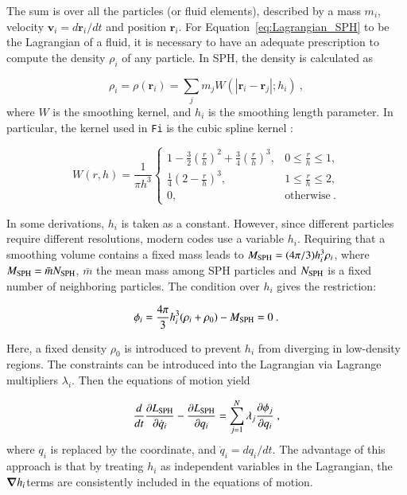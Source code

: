 \begin{appendixs}
	The sum is over all the particles (or fluid elements), described by a mass $m_i$, velocity $\mathbf{v}_i = d \mathbf{r}_i/dt$ and position $\mathbf{r}_i$. For Equation~\ref{eq:Lagrangian_SPH} to be the Lagrangian of a fluid, it is necessary to have an adequate prescription to compute the density $\rho_i$ of any particle. In SPH, the density is calculated as
	
	\begin{equation}
		\rho_i = \rho(\mathbf{r}_i) = \sum_{j} m_j W(|\mathbf{r}_i - \mathbf{r}_j|;h_i)~,
	\end{equation}
	where $W$ is the smoothing kernel, and $h_i$ is the smoothing length parameter. In particular, the kernel used in \texttt{Fi} is the cubic spline kernel \citep{pelupessy2005numerical,monaghan1992smoothed}:
	
	\begin{equation}
		W(r,h) = \frac{1}{\pi h^3}
		\begin{cases}
			1 - \frac{3}{2}\left(\frac{r}{h}\right)^2 + \frac{3}{4}\left(\frac{r}{h}\right)^3, & 0 \leq \frac{r}{h} \leq 1, \\[2ex]
			\frac{1}{4}\left(2 - \frac{r}{h}\right)^3, & 1 \leq \frac{r}{h} \leq 2, \\[2ex]
			0, & \text{otherwise}~.
		\end{cases}
	\end{equation}
	
	In some derivations, $h_i$ is taken as a constant. However, since different particles require different resolutions, modern codes use a variable $h_i$. Requiring that a smoothing volume contains a fixed mass leads to $M_{\rm SPH} = (4 \pi /3)h_i^3 \rho_i$, where $M_{\rm SPH} = \bar{m}N_{\rm SPH}$, $\bar{m}$ the mean mass among SPH particles and $N_{\rm SPH}$ is a fixed number of neighboring particles. The condition over $h_i$ gives the restriction:
	
	\begin{equation}
		\phi_i = \frac{4 \pi}{3}h_i^3(\rho_i + \rho_0) - M_{\rm SPH} = 0~.
	\end{equation}
	
	Here, a fixed density $\rho_0$ is introduced to prevent $h_i$ from diverging in low-density regions. The constraints can be introduced into the Lagrangian via Lagrange multipliers $\lambda_i$. Then the equations of motion yield
	
	\begin{equation}
		\frac{d}{dt}\frac{\partial L_{\rm SPH}}{\partial \dot{q}_i} - \frac{\partial L_{\rm SPH}}{\partial q_i} = \sum_{j=1}^{N}\lambda_j \frac{\partial \phi_j}{\partial q_i}~,
		\label{eq:lagrangian_equations}
	\end{equation}
	where $q_i$ is replaced by the coordinate, and $\dot{q}_i = d q_i/dt$. The advantage of this approach is that by treating $h_i$ as independent variables in the Lagrangian, the $\grad{h_i}$terms are consistently included in the equations of motion.
	

\end{appendixs}
